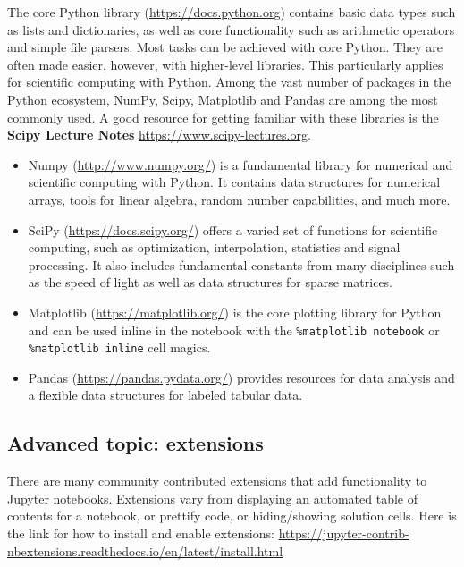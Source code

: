 \documentclass[]{book}
\providecommand{\tightlist}{%
  \setlength{\itemsep}{0pt}\setlength{\parskip}{0pt}}
\begin{document}
The core Python library
(\href{https://docs.python.org/3/}{https://docs.python.org}) contains
basic data types such as lists and dictionaries, as well as core
functionality such as arithmetic operators and simple file parsers. Most
tasks can be achieved with core Python. They are often made easier,
however, with higher-level libraries. This particularly applies for
scientific computing with Python. Among the vast number of packages in
the Python ecosystem, NumPy, Scipy, Matplotlib and Pandas are among the
most commonly used. A good resource for getting familiar with these
libraries is the \textbf{Scipy Lecture Notes}
\url{https://www.scipy-lectures.org}.

\begin{itemize}
\tightlist
\item
  Numpy (\url{http://www.numpy.org/}) is a fundamental library for
  numerical and scientific computing with Python. It contains data
  structures for numerical arrays, tools for linear algebra, random
  number capabilities, and much more.
\item
  SciPy (\href{https://docs.scipy.rg/}{https://docs.scipy.org/}) offers
  a varied set of functions for scientific computing, such as
  optimization, interpolation, statistics and signal processing. It also
  includes fundamental constants from many disciplines such as the speed
  of light as well as data structures for sparse matrices.
\item
  Matplotlib (\url{https://matplotlib.org/}) is the core plotting
  library for Python and can be used inline in the notebook with the
  \texttt{\%matplotlib\ notebook} or \texttt{\%matplotlib\ inline} cell
  magics.
\item
  Pandas (\url{https://pandas.pydata.org/}) provides resources for data
  analysis and a flexible data structures for labeled tabular data.
\end{itemize}

\subsection{Advanced topic: extensions}\label{advanced-topic-extensions}

There are many community contributed extensions that add functionality
to Jupyter notebooks. Extensions vary from displaying an automated table
of contents for a notebook, or prettify code, or hiding/showing solution
cells. Here is the link for how to install and enable extensions:
\url{https://jupyter-contrib-nbextensions.readthedocs.io/en/latest/install.html}
\end{document}
